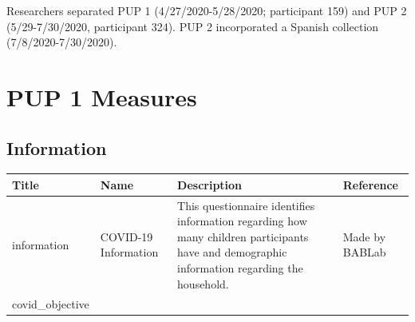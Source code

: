 \documentclass[]{book}
\begin{document}
Researchers separated PUP 1 (4/27/2020-5/28/2020; participant 159) and PUP 2 (5/29-7/30/2020, participant 324). PUP 2 incorporated a Spanish collection (7/8/2020-7/30/2020).

\hypertarget{pup-1-measures}{%
\section{PUP 1 Measures}\label{pup-1-measures}}

\hypertarget{information}{%
\subsection{Information}\label{information}}

\begin{longtable}[]{@{}llll@{}}
\toprule
\begin{minipage}[b]{0.13\columnwidth}\raggedright
Title\strut
\end{minipage} & \begin{minipage}[b]{0.21\columnwidth}\raggedright
Name\strut
\end{minipage} & \begin{minipage}[b]{0.31\columnwidth}\raggedright
Description\strut
\end{minipage} & \begin{minipage}[b]{0.23\columnwidth}\raggedright
Reference\strut
\end{minipage}\tabularnewline
\midrule
\endhead
\begin{minipage}[t]{0.13\columnwidth}\raggedright
information\strut
\end{minipage} & \begin{minipage}[t]{0.21\columnwidth}\raggedright
COVID-19 Information\strut
\end{minipage} & \begin{minipage}[t]{0.31\columnwidth}\raggedright
This questionnaire identifies information regarding how many children participants have and demographic information regarding the household.\strut
\end{minipage} & \begin{minipage}[t]{0.23\columnwidth}\raggedright
Made by BABLab\strut
\end{minipage}\tabularnewline
\begin{minipage}[t]{0.13\columnwidth}\raggedright
covid\_objective\strut
\end{minipage} & \begin{minipage}[t]{0.21\columnwidth}\raggedright

\end{minipage}
\end{longtable}
\end{document}
